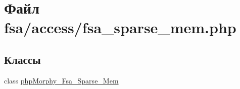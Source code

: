 \hypertarget{fsa__sparse__mem_8php}{
\section{Файл fsa/access/fsa\_\-sparse\_\-mem.php}
\label{fsa__sparse__mem_8php}
}
\subsection*{Классы}
\begin{DoxyCompactItemize}
\item 
class \hyperlink{classphpMorphy__Fsa__Sparse__Mem}{phpMorphy\_\-Fsa\_\-Sparse\_\-Mem}
\end{DoxyCompactItemize}
